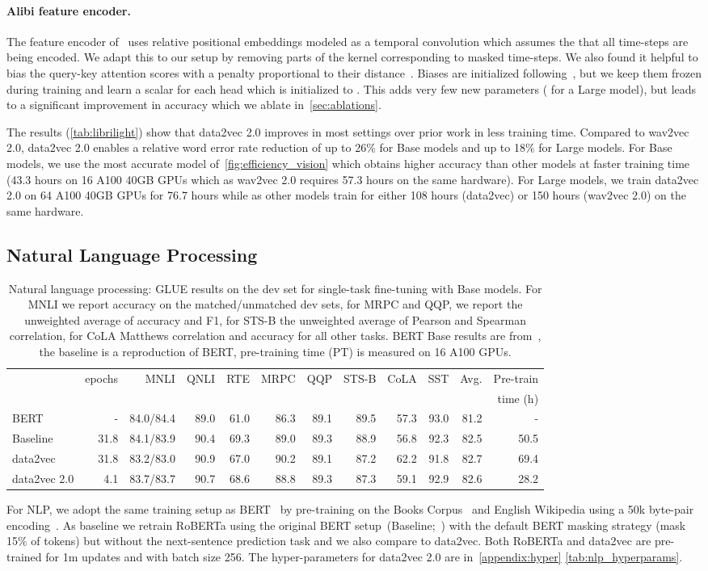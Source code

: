 \documentclass[nohyperref]{article}
\theoremstyle{plain}
\theoremstyle{definition}
\theoremstyle{remark}
\newcommand{\name}{data2vec 2.0}
\newcommand{\insertGLUEtable}{
\begin{table*}[h!]
\centering
\caption{Natural language processing: GLUE results on the dev set for single-task fine-tuning with Base models.
For MNLI we report accuracy on the matched/unmatched dev sets, for MRPC and QQP, we report the unweighted average of accuracy and F1, for STS-B the unweighted average of Pearson and Spearman correlation, for CoLA Matthews correlation and accuracy for all other tasks.
BERT Base results are from~\citet{wu2020clear}, the baseline is a reproduction of BERT, pre-training time (PT) is measured on 16 A100 GPUs.
\label{tab:glue}
} 
\vspace{0.075in}
\begin{tabular}{lrrrrrrrrrrr}
\toprule
& epochs & MNLI & QNLI & RTE & MRPC & QQP & STS-B & CoLA & SST & Avg. & Pre-train \\
& & & & & & & & & & & time (h) \\
\midrule
BERT & - & 84.0/84.4 & 89.0 & 61.0 & 86.3 & 89.1 & 89.5 & 57.3 & 93.0 & 81.2 & - \\
Baseline & 31.8 & 84.1/83.9 & 90.4 & 69.3 & 89.0 & 89.3 & 88.9 & 56.8 & 92.3 & 82.5 & 50.5 \\ 
data2vec & 31.8 & 83.2/83.0 & 90.9 & 67.0 & 90.2 & 89.1 & 87.2 & 62.2 & 91.8 & 82.7 & 69.4 \\
\name{} & 4.1 & 83.7/83.7 & 90.7 & 68.6 & 88.8 & 89.3 & 87.3 & 59.1 & 92.9 & 82.6 & 28.2 \\
\bottomrule
\end{tabular}
\end{table*}
}
\begin{document}
\paragraph{Alibi feature encoder.}
The feature encoder of~\citet{baevski2020wav} uses relative positional embeddings modeled as a temporal convolution which assumes the that all time-steps are being encoded. 
We adapt this to our setup by removing parts of the kernel corresponding to masked time-steps.
We also found it helpful to bias the query-key attention scores with a penalty proportional to their distance~\citep{press2021alibi}.
Biases are initialized following~\citet{press2021alibi}, but we keep them frozen during training and learn a scalar for each head which is initialized to . 
This adds very few new parameters ( for a Large model), but leads to a significant improvement in accuracy which we ablate in~\textsection\ref{sec:ablations}.

The results (\autoref{tab:librilight}) show that \name{} improves in most settings over prior work in less training time. 
Compared to wav2vec 2.0, \name{} enables a relative word error rate reduction of up to 26\% for Base models and up to 18\% for Large models.
For Base models, we use the most accurate model of~\autoref{fig:efficiency_vision} which obtains higher accuracy than other models at faster training time (43.3 hours on 16 A100 40GB GPUs which as wav2vec 2.0 requires 57.3 hours on the same hardware).
For Large models, we train \name{} on 64 A100 40GB GPUs for 76.7 hours while as other models train for either 108 hours (data2vec) or 150 hours (wav2vec 2.0) on the same hardware.

\subsection{Natural Language Processing}
\label{sec:nlp}

\insertGLUEtable

For NLP, we adopt the same training setup as BERT~\citep{devlin2018bert} by pre-training on the Books Corpus~\citep{zhu2015books} and English Wikipedia using a 50k byte-pair encoding~\citep{sennrich2016bpe,devlin2018bert,liu2019roberta}.
As baseline we retrain RoBERTa using the original BERT setup~(Baseline;~\citealt{liu2019roberta}) with the default BERT masking strategy (mask 15\% of tokens) but without the next-sentence prediction task and we also compare to data2vec. 
Both RoBERTa and data2vec are pre-trained for 1m updates and with batch size 256.
The hyper-parameters for \name{} are in~\autoref{appendix:hyper} \autoref{tab:nlp_hyperparams}.
\end{document}
